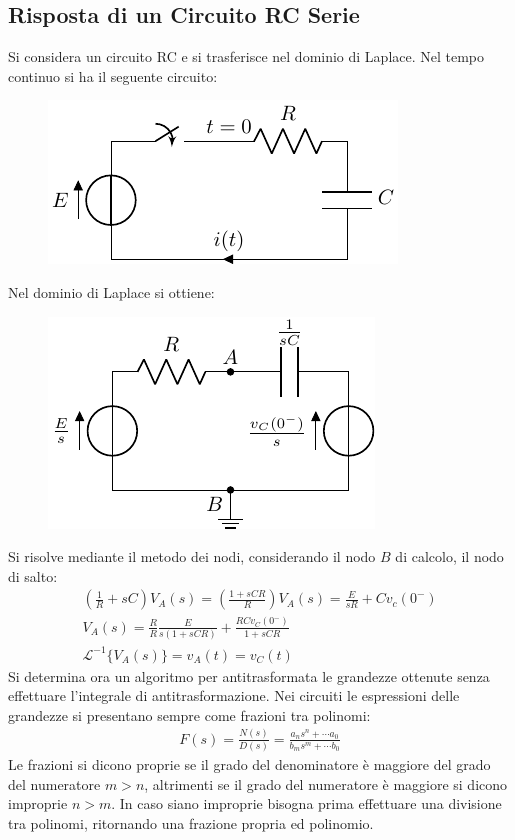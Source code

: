 \documentclass{article}
\numberwithin{equation}{subsection}
\begin{document}
\subsection{Risposta di un Circuito RC Serie}

Si considera un circuito RC e si trasferisce nel dominio di Laplace. Nel tempo continuo si ha il seguente circuito:
\begin{figure}[H]%
    \centering
    \includegraphics{circuito-rc-tempo-continuo.pdf}%
    \label{fig:circuito-rc-tempo-continuo}
\end{figure}
Nel dominio di Laplace si ottiene:
\begin{figure}[H]%
    \centering
    \includegraphics{circuito-rc-laplace.pdf}%
    \label{fig:circuito-rc-laplace}
\end{figure}
Si risolve mediante il metodo dei nodi, considerando il nodo $B$ di calcolo, il nodo di salto:
\begin{gather*}
    \left(\displaystyle\frac{1}{R}+sC\right)V_A(s)=\left(\frac{1+sCR}{R}\right)V_A(s)=\displaystyle\frac{E}{sR}+Cv_c(0^-)\\
    V_A(s)=\displaystyle\frac{R}{R}\frac{E}{s(1+sCR)}+\frac{RCv_C(0^-)}{1+sCR}\\
    \mathcal{L}^{-1}\{V_A(s)\}=v_A(t)= v_C(t)
\end{gather*}
Si determina ora un algoritmo per antitrasformata le grandezze ottenute senza effettuare l'integrale di antitrasformazione. 
Nei circuiti le espressioni delle grandezze si presentano sempre come frazioni tra polinomi:
\begin{gather*}
    F(s)=\displaystyle\frac{N(s)}{D(s)}=\frac{a_ns^n+\cdots a_0}{b_ms^m+\cdots b_0}
\end{gather*}
Le frazioni si dicono proprie se il grado del denominatore è maggiore del grado del numeratore $m>n$, altrimenti se il grado del numeratore è maggiore si dicono improprie $n>m$. 
In caso siano improprie bisogna prima effettuare una divisione tra polinomi, ritornando una frazione propria ed polinomio.
\end{document}
